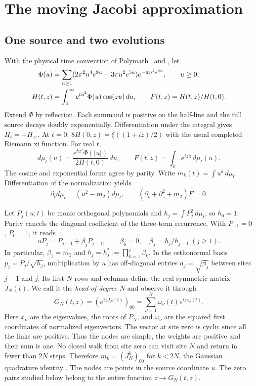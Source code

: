 \section{The moving Jacobi approximation}\label{sec:source}
\subsection{One source and two evolutions}
With the physical time convention of Polymath~\cite{polymath} and
\cite[(1.1)--(1.5)]{agc}, let
\begin{align}
 \Phi(u)&=\sum_{n\ge1}(2\pi^2 n^4 e^{9u}-3\pi n^2 e^{5u})
                       e^{-\pi n^2 e^{4u}},\qquad u\ge0, \notag\\
 H(t,z)&=\int_0^\infty e^{tu^2}\Phi(u)\cos(zu)\,du,\qquad
 F(t,z)=H(t,z)/H(t,0). \label{eq:source}
\end{align}
Extend \(\Phi\) by reflection. Each summand is positive on the half-line and the full source decays doubly exponentially. Differentiation under the integral gives \(H_t=-H_{zz}\). At \(t=0\), \(8H(0,z)=\xi((1+iz)/2)\) with the usual completed Riemann xi function. For real \(t\),
\[
 d\mu_t(u)=\frac{e^{tu^2}\Phi(|u|)}{2H(t,0)}\,du,\qquad
 F(t,z)=\int_{\mathbb R}e^{izu}\,d\mu_t(u).
\]
The cosine and exponential forms agree by parity. Write \(m_k(t)=\int u^k\,d\mu_t\). Differentiation of the normalization yields
\begin{equation}
 \partial_t d\mu_t=(u^2-m_2)d\mu_t,\qquad
 (\partial_t+\partial_z^2+m_2)F=0 . \label{eq:norm-heat}
\end{equation}

Let \(P_j(u;t)\) be monic orthogonal polynomials and \(h_j=\int P_j^2\,d\mu_t\), so \(h_0=1\). Parity cancels the diagonal coefficient of the three-term recurrence. With \(P_{-1}=0\), \(P_0=1\), it reads
\begin{equation}
 uP_j=P_{j+1}+\beta_jP_{j-1},\qquad
 \beta_0=0,\quad \beta_j=h_j/h_{j-1}\ (j\ge1).
 \label{eq:monic}
\end{equation}
In particular, \(\beta_1=m_2\) and \(h_j=h_j^*:=\prod_{k=1}^j\beta_k\).
In the orthonormal basis \(p_j=P_j/\sqrt{h_j}\), multiplication by \(u\) has off-diagonal entries \(a_j=\sqrt{\beta_j}\) between sites \(j-1\) and \(j\). Its first \(N\) rows and columns define the real symmetric matrix \(J_N(t)\). We call it the \emph{head of degree \(N\)} and observe it through
\begin{equation}
 G_N(t,z)=(e^{izJ_N(t)})_{00}=\sum_{\nu=1}^N\omega_\nu(t)e^{izx_\nu(t)} .
 \label{eq:G}
\end{equation}
Here \(x_\nu\) are the eigenvalues, the roots of \(P_N\), and \(\omega_\nu\) are the squared first coordinates of normalized eigenvectors. The vector at site zero is cyclic since all the links are positive. Thus the nodes are simple, the weights are positive and their sum is one. No closed walk from site zero can visit site \(N\) and return in fewer than \(2N\) steps. Therefore \(m_k=(J_N^k)_{00}\) for \(k<2N\), the Gaussian quadrature identity \cite[\S3.5(v)--(vi)]{dlmf}. The nodes are points in the source coordinate \(u\). The zero pairs studied below belong to the entire function \(z\mapsto G_N(t,z)\).

